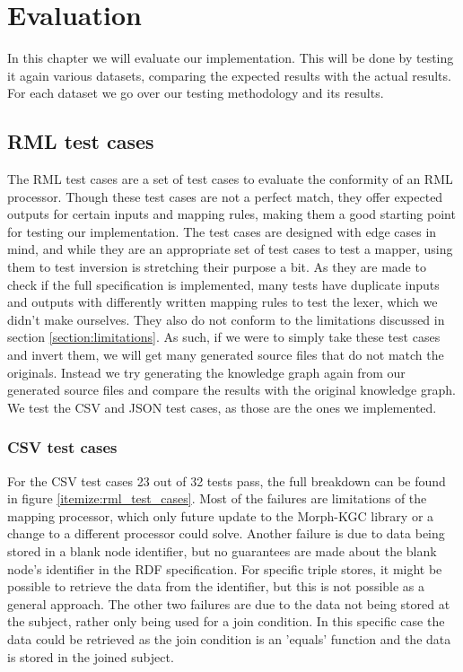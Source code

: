 \chapter{Evaluation}
\label{chapter:evaluation}
In this chapter we will evaluate our implementation. This will be done by testing it again various datasets, comparing the expected results with the actual results. For each dataset we go over our testing methodology and its results.

\section{RML test cases}
\label{section:rml_test_cases}
The RML test cases \citep{rml-test-cases} are a set of test cases to evaluate the conformity of an RML processor. Though these test cases are not a perfect match, they offer expected outputs for certain inputs and mapping rules, making them a good starting point for testing our implementation. The test cases are designed with edge cases in mind, and while they are an appropriate set of test cases to test a mapper, using them to test inversion is stretching their purpose a bit. 
As they are made to check if the full specification is implemented, many tests have duplicate inputs and outputs with differently written mapping rules to test the lexer, which we didn't make ourselves. They also do not conform to the limitations discussed in section \ref{section:limitations}. As such, if we were to simply take these test cases and invert them, we will get many generated source files that do not match the originals. Instead we try generating the knowledge graph again from our generated source files and compare the results with the original knowledge graph. We test the CSV and JSON test cases, as those are the ones we implemented.

\subsection{CSV test cases}
For the CSV test cases 23 out of 32 tests pass, the full breakdown can be found in figure \ref{itemize:rml_test_cases}. Most of the failures are limitations of the mapping processor, which only future update to the Morph-KGC library or a change to a different processor could solve. Another failure is due to data being stored in a blank node identifier, but no guarantees are made about the blank node's identifier in the RDF specification. For specific triple stores, it might be possible to retrieve the data from the identifier, but this is not possible as a general approach. The other two failures are due to the data not being stored at the subject, rather only being used for a join condition. In this specific case the data could be retrieved as the join condition is an 'equals' function and the data is stored in the joined subject.

